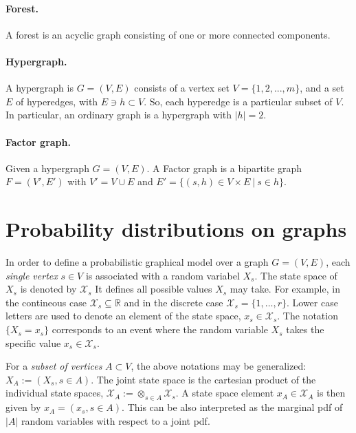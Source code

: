 \paragraph*{Forest.} A forest is an acyclic graph consisting of one or more connected components.

\paragraph*{Hypergraph.} A hypergraph is $G = (V, E)$ 
consists of a vertex set $V = \{1, 2, . . . , m\}$, and a set $E$ of hyperedges, with $ E \ni h \subset V$. So, each hyperedge  is a particular subset of $V$. In particular, an ordinary graph is a hypergraph with $|h| = 2$. 

\paragraph*{Factor graph.} Given a hypergraph $G = (V, E)$. A Factor graph is a bipartite graph $F=(V', E')$ with $V' = V \cup E$ and $E'=\{(s,h) \in V\times E ~ | ~ s \in h \}$.
 
\section{Probability distributions on graphs}
In order to define a probabilistic graphical model over a graph $G=(V, E)$, each \textit{single vertex} $s \in V$ is associated with a random variabel $X_s$. 
The state space of $X_s$ is denoted by $\mathcal X_s$ It defines all possible values $X_s$  may take. 
For example, in the contineous case $\mathcal X_s \subseteq \mathbb{R}$ and in the discrete case $\mathcal X_s = \{1, \dots, r\}$. 
Lower case letters are used to denote an element of the state space, $x_s \in \mathcal X_s$. 
The notation $\{X_s = x_s\}$ corresponds to an event where the random variable $X_s$ takes the specific value $x_s \in \mathcal X_s$.

For a \textit{subset of vertices} $A \subset V$, the above notations may be generalized: $X_A := (X_s, s \in A)$.  
The joint state space is  the cartesian product of the individual state spaces, $\mathcal X_A := \otimes_{s\in A} \mathcal X_s$. 
A state space element $x_A \in \mathcal X_A$ is then given by  $x_A = (x_s, s \in A)$. This can be also interpreted as the marginal pdf of $|A|$ random variables with respect to a joint pdf.



